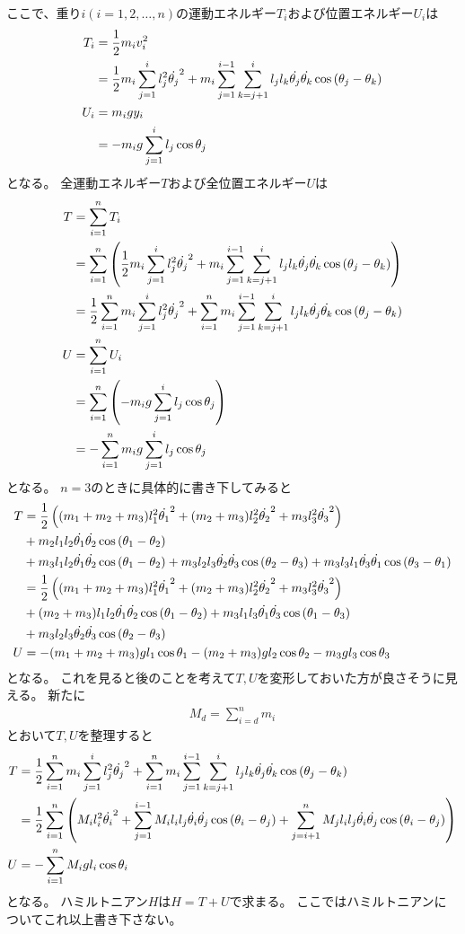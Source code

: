 \documentclass{jsarticle}
\newcommand{\eqa}[1]{\begin{align}#1\end{align}}
\newcommand{\cost}[2]{\cos\left(\theta_{#1}-\theta_{#2}\right)}
\newcommand{\dott}[1]{\dot{\theta_{#1}}}
\begin{document}
ここで、重り$i(i=1,2,\dots,n)$の運動エネルギー$T_i$および位置エネルギー$U_i$は
\eqa{
	T_i &= \frac{1}{2} m_i v_i^2 \notag\\
		&= \frac{1}{2} m_i\sum_{j=1}^i l_j^2 \dott{j}^2
			+ m_i\sum_{j=1}^{i-1} \sum_{k=j+1}^i l_j l_k \dott{j} \dott{k} \cost{j}{k} \\
	U_i &= m_i g y_i \notag\\
		&= -m_i g \sum_{j=1}^i l_j \cos\theta_j
}
となる。
全運動エネルギー$T$および全位置エネルギー$U$は
\eqa{
	T &= \sum_{i=1}^n T_i \notag\\
		&= \sum_{i=1}^n \left( \frac{1}{2} m_i\sum_{j=1}^i l_j^2 \dott{j}^2
			+ m_i\sum_{j=1}^{i-1} \sum_{k=j+1}^i l_j l_k \dott{j} \dott{k} \cost{j}{k} \right) \notag\\
		&= \frac{1}{2} \sum_{i=1}^n m_i \sum_{j=1}^i l_j^2 \dott{j}^2
			+ \sum_{i=1}^n m_i \sum_{j=1}^{i-1} \sum_{k=j+1}^i l_j l_k \dott{j} \dott{k} \cost{j}{k} \notag\\
	U &= \sum_{i=1}^n U_i \notag\\
		&= \sum_{i=1}^n \left(-m_i g \sum_{j=1}^i l_j \cos\theta_j \right) \notag\\
		&= - \sum_{i=1}^n m_i g \sum_{j=1}^i l_j \cos\theta_j
}
となる。
$n=3$のときに具体的に書き下してみると
\eqa{
	T &= \frac{1}{2} \left( (m_1 + m_2 + m_3) l_1^2 \dott{1}^2 + (m_2 + m_3) l_2^2 \dott{2}^2 + m_3 l_3^2 \dott{3}^2 \right) \notag\\
		&+ m_2 l_1 l_2 \dott{1} \dott{2} \cost{1}{2} \notag\\
		&+ m_3 l_1 l_2 \dott{1} \dott{2} \cost{1}{2} + m_3 l_2 l_3 \dott{2} \dott{3} \cost{2}{3} + m_3 l_3 l_1 \dott{3} \dott{1} \cost{3}{1} \notag\\
		&= \frac{1}{2} \left( (m_1 + m_2 + m_3) l_1^2 \dott{1}^2 + (m_2 + m_3) l_2^2 \dott{2}^2 + m_3 l_3^2 \dott{3}^2 \right) \notag\\
		&+ (m_2 + m_3) l_1 l_2 \dott{1} \dott{2} \cost{1}{2} + m_3 l_1 l_3 \dott{1} \dott{3} \cost{1}{3} \notag\\
		&+ m_3 l_2 l_3 \dott{2} \dott{3} \cost{2}{3} \notag\\
	U &= -(m_1 + m_2 + m_3) g l_1 \cos\theta_1 - (m_2 + m_3) g l_2 \cos\theta_2 - m_3 g l_3 \cos\theta_3 \notag
}
となる。
これを見ると後のことを考えて$T,U$を変形しておいた方が良さそうに見える。
新たに
\eqa{
	M_d = \sum_{i=d}^n m_i
}
とおいて$T,U$を整理すると
\eqa{
	T &= \frac{1}{2} \sum_{i=1}^n m_i \sum_{j=1}^i l_j^2 \dott{j}^2
			+ \sum_{i=1}^n m_i \sum_{j=1}^{i-1} \sum_{k=j+1}^i l_j l_k \dott{j} \dott{k} \cost{j}{k} \notag\\
		&= \frac{1}{2} \sum_{i=1}^n \left(
			M_i l_i^2 \dott{i}^2
			+ \sum_{j=1}^{i-1} M_i l_i l_j \dott{i} \dott{j} \cost{i}{j}
			+ \sum_{j=i+1}^n M_j l_i l_j \dott{i} \dott{j} \cost{i}{j}
		\right) \\
	U &= -\sum_{i=1}^n M_i g l_i \cos\theta_i
}
となる。
ハミルトニアン$H$は$H=T+U$で求まる。
ここではハミルトニアンについてこれ以上書き下さない。
\end{document}

